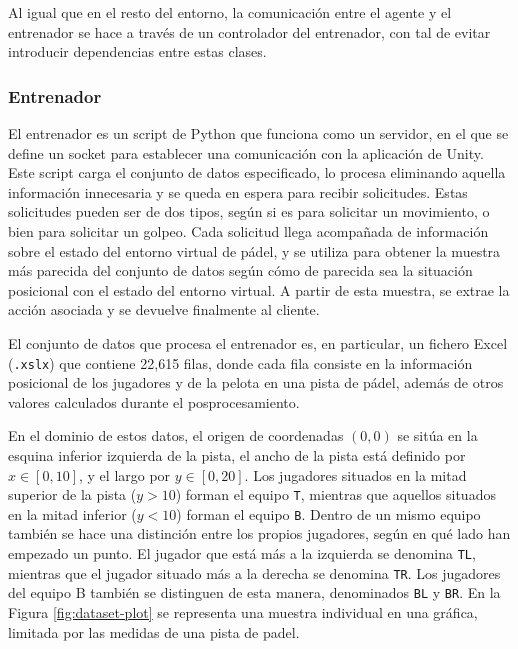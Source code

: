 Al igual que en el resto del entorno, la comunicación entre el agente y el entrenador se hace a través de un controlador del entrenador, con tal de evitar introducir dependencias entre estas clases.

\subsubsection{Entrenador}

El entrenador es un script de Python que funciona como un servidor, en el que se define un socket para establecer una comunicación con la aplicación de Unity. Este script carga el conjunto de datos especificado, lo procesa eliminando aquella información innecesaria y se queda en espera para recibir solicitudes. Estas solicitudes pueden ser de dos tipos, según si es para solicitar un movimiento, o bien para solicitar un golpeo. Cada solicitud llega acompañada de información sobre el estado del entorno virtual de pádel, y se utiliza para obtener la muestra más parecida del conjunto de datos según cómo de parecida sea la situación posicional con el estado del entorno virtual. A partir de esta muestra, se extrae la acción asociada y se devuelve finalmente al cliente.

El conjunto de datos que procesa el entrenador es, en particular, un fichero Excel (\texttt{.xslx}) que contiene 22,615 filas, donde cada fila consiste en la información posicional de los jugadores y de la pelota en una pista de pádel, además de otros valores calculados durante el posprocesamiento.

\newpage

En el dominio de estos datos, el origen de coordenadas $(0, 0)$ se sitúa en la esquina inferior izquierda de la pista, el ancho de la pista está definido por $x \in [0, 10]$, y el largo por $y \in [0, 20]$. Los jugadores situados en la mitad superior de la pista ($y > 10$) forman el equipo \texttt{T}, mientras que aquellos situados en la mitad inferior ($y < 10$) forman el equipo \texttt{B}. Dentro de un mismo equipo también se hace una distinción entre los propios jugadores, según en qué lado han empezado un punto. El jugador que está más a la izquierda se denomina \texttt{TL}, mientras que el jugador situado más a la derecha se denomina \texttt{TR}. Los jugadores del equipo B también se distinguen de esta manera, denominados \texttt{BL} y \texttt{BR}. En la Figura \ref{fig:dataset-plot} se representa una muestra individual en una gráfica, limitada por las medidas de una pista de padel.

